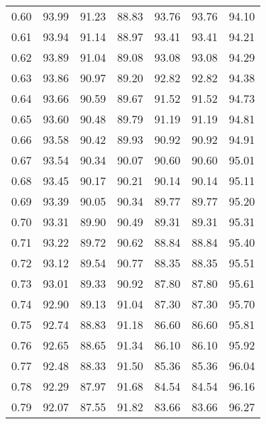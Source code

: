 \begin{tabular}{|c|c|c|c|c|c|c|}
      0.60 &     93.99 &     91.23 &      88.83 &   93.76 &      93.76 &         94.10 \\
      0.61 &     93.94 &     91.14 &      88.97 &   93.41 &      93.41 &         94.21 \\
      0.62 &     93.89 &     91.04 &      89.08 &   93.08 &      93.08 &         94.29 \\
      0.63 &     93.86 &     90.97 &      89.20 &   92.82 &      92.82 &         94.38 \\
      0.64 &     93.66 &     90.59 &      89.67 &   91.52 &      91.52 &         94.73 \\
      0.65 &     93.60 &     90.48 &      89.79 &   91.19 &      91.19 &         94.81 \\
      0.66 &     93.58 &     90.42 &      89.93 &   90.92 &      90.92 &         94.91 \\
      0.67 &     93.54 &     90.34 &      90.07 &   90.60 &      90.60 &         95.01 \\
      0.68 &     93.45 &     90.17 &      90.21 &   90.14 &      90.14 &         95.11 \\
      0.69 &     93.39 &     90.05 &      90.34 &   89.77 &      89.77 &         95.20 \\
      0.70 &     93.31 &     89.90 &      90.49 &   89.31 &      89.31 &         95.31 \\
      0.71 &     93.22 &     89.72 &      90.62 &   88.84 &      88.84 &         95.40 \\
      0.72 &     93.12 &     89.54 &      90.77 &   88.35 &      88.35 &         95.51 \\
      0.73 &     93.01 &     89.33 &      90.92 &   87.80 &      87.80 &         95.61 \\
      0.74 &     92.90 &     89.13 &      91.04 &   87.30 &      87.30 &         95.70 \\
      0.75 &     92.74 &     88.83 &      91.18 &   86.60 &      86.60 &         95.81 \\
      0.76 &     92.65 &     88.65 &      91.34 &   86.10 &      86.10 &         95.92 \\
      0.77 &     92.48 &     88.33 &      91.50 &   85.36 &      85.36 &         96.04 \\
      0.78 &     92.29 &     87.97 &      91.68 &   84.54 &      84.54 &         96.16 \\
      0.79 &     92.07 &     87.55 &      91.82 &   83.66 &      83.66 &         96.27 \\

\end{tabular}

